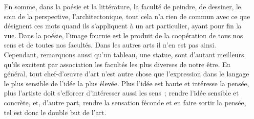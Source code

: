 \documentclass[french,twoside]{book} %
\begin{document}
 En somme, dans la poésie et la littérature, la faculté de peindre, de dessiner, le soin de la perspective, l’architectonique, tout cela n’a rien de commun avec ce que désignent ces mots quand ils s’appliquent à un art particulier, ayant pour fin la vue. Dans la poésie, l’image fournie est le produit de la coopération de tous nos sens et de toutes nos facultés. Dans les autres arts il n’en est pas ainsi. Cependant, remarquons aussi qu’un tableau, une statue, sont d’autant meilleurs qu’ils excitent par association les facultés les plus diverses de notre être. En général, tout chef-d’œuvre d’art n’est autre chose que l’expression dans le langage le plus sensible de l’idée la plus élevée. Plus l’idée est haute et intéresse la pensée, plus l’artiste doit s’efforcer d’intéresser aussi les sens ; rendre l’idée sensible et concrète, et, d’autre part, rendre la sensation féconde et en faire sortir la pensée, tel est donc le double but de l’art.\par
\par
\end{document}
